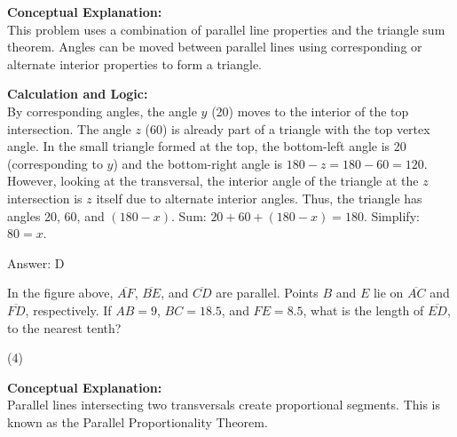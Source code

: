 \documentclass[11pt,paper=a4,answers]{exam}
\begin{document}
\begin{questions}
\begin{solution}
\textbf{Conceptual Explanation:} \\
This problem uses a combination of parallel line properties and the triangle sum theorem. Angles can be moved between parallel lines using corresponding or alternate interior properties to form a triangle.

\vspace{30pt}

\textbf{Calculation and Logic:} \\
By corresponding angles, the angle $y$ (20) moves to the interior of the top intersection. The angle $z$ (60) is already part of a triangle with the top vertex angle. In the small triangle formed at the top, the bottom-left angle is 20 (corresponding to $y$) and the bottom-right angle is $180 - z = 180 - 60 = 120$. However, looking at the transversal, the interior angle of the triangle at the $z$ intersection is $z$ itself due to alternate interior angles. Thus, the triangle has angles 20, 60, and $(180 - x)$. Sum: $20 + 60 + (180 - x) = 180$. Simplify: $80 = x$.

\vspace{30pt}

Answer: \colorbox{yellow!100}{D}
\end{solution}

\vspace{60pt}

\question
\begin{center}
\end{center}
In the figure above, $\overline{AF}$, $\overline{BE}$, and $\overline{CD}$ are parallel. Points $B$ and $E$ lie on $\overline{AC}$ and $\overline{FD}$, respectively. If $AB = 9$, $BC = 18.5$, and $FE = 8.5$, what is the length of $\overline{ED}$, to the nearest tenth?
\begin{tasks}(4)
\end{tasks}

\begin{solution}
\textbf{Conceptual Explanation:} \\
Parallel lines intersecting two transversals create proportional segments. This is known as the Parallel Proportionality Theorem.


\end{solution}
\end{questions}
\end{document}
